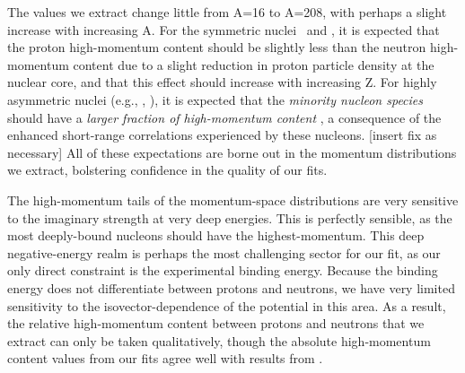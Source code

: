 The values we extract change little from A=16 to A=208, with perhaps a slight
increase with increasing A.
For the symmetric nuclei \oSix\ and \caForty, it is expected that the proton
high-momentum content should be slightly less than the neutron high-momentum
content due to a slight reduction in proton particle density at the nuclear
core, and that this effect should increase with increasing Z. For highly asymmetric
nuclei (e.g., \snFour, \pbEight), it is expected that the \textit{minority
nucleon species} should have a \textit{larger fraction of high-momentum
content} \cite{Subedi2008, Hen2012}, a consequence of the enhanced
short-range correlations experienced by these nucleons. [insert fix as necessary] All of these expectations are borne
out in the momentum distributions we extract, bolstering confidence in the
quality of our fits.

The high-momentum tails of the
momentum-space distributions are very sensitive to the imaginary
strength at very deep energies. This is perfectly sensible, as the most deeply-bound
nucleons should have the highest-momentum. This deep
negative-energy realm is perhaps the most challenging sector for our fit,
as our only direct constraint is the experimental binding energy. Because the
binding energy does not differentiate between protons and neutrons, we have
very limited sensitivity to the isovector-dependence of the potential in
this area. As a result, the relative high-momentum content between protons and
neutrons that we extract can only be taken qualitatively, though the absolute
high-momentum content values from our fits agree well with results from
\cite{Rohe2004, RoheHabilitation}.

